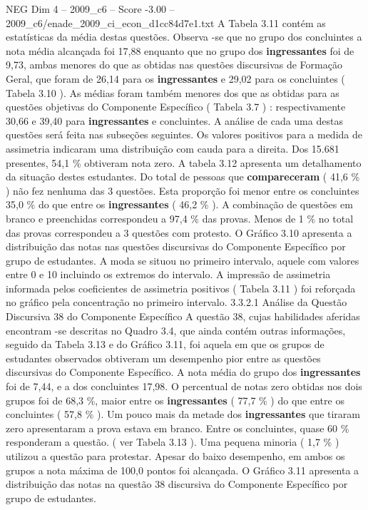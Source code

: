 \begin{textsample}{NEG Dim 4 – 2009\_c6 – Score -3.00 – 2009\_c6/enade\_2009\_ci\_econ\_d1cc84d7e1.txt}
A Tabela 3.11 contém as estatísticas da média destas questões.
Observa -se que no grupo dos concluintes a nota média alcançada foi 17,88 enquanto que no grupo dos \textbf{ingressantes} foi de 9,73, ambas menores do que as obtidas nas questões discursivas de Formação Geral, que foram de 26,14 para os \textbf{ingressantes} e 29,02 para os concluintes ( Tabela 3.10 ).
As médias foram também menores dos que as obtidas para as questões objetivas do Componente Específico ( Tabela 3.7 ) : respectivamente 30,66 e 39,40 para \textbf{ingressantes} e concluintes.
A análise de cada uma destas questões será feita nas subseções seguintes.
Os valores positivos para a medida de assimetria indicaram uma distribuição com cauda para a direita.
Dos 15.681 presentes, 54,1 \% obtiveram nota zero.
A tabela 3.12 apresenta um detalhamento da situação destes estudantes.
Do total de pessoas que \textbf{compareceram} ( 41,6 \% ) não fez nenhuma das 3 questões.
Esta proporção foi menor entre os concluintes 35,0 \% do que entre os \textbf{ingressantes} ( 46,2 \% ).
A combinação de questões em branco e preenchidas correspondeu a 97,4 \% das provas.
Menos de 1 \% no total das provas correspondeu a 3 questões com protesto.
O Gráfico 3.10 apresenta a distribuição das notas nas questões discursivas do Componente Específico por grupo de estudantes.
A moda se situou no primeiro intervalo, aquele com valores entre 0 e 10 incluindo os extremos do intervalo.
A impressão de assimetria informada pelos coeficientes de assimetria positivos ( Tabela 3.11 ) foi reforçada no gráfico pela concentração no primeiro intervalo. 3.3.2.1 Análise da Questão Discursiva 38 do Componente Específico A questão 38, cujas habilidades aferidas encontram -se descritas no Quadro 3.4, que ainda contém outras informações, seguido da Tabela 3.13 e do Gráfico 3.11, foi aquela em que os grupos de estudantes observados obtiveram um desempenho pior entre as questões discursivas do Componente Específico.
A nota média do grupo dos \textbf{ingressantes} foi de 7,44, e a dos concluintes 17,98.
O percentual de notas zero obtidas nos dois grupos foi de 68,3 \%, maior entre os \textbf{ingressantes} ( 77,7 \% ) do que entre os concluintes ( 57,8 \% ).
Um pouco mais da metade dos \textbf{ingressantes} que tiraram zero apresentaram a prova estava em branco.
Entre os concluintes, quase 60 \% responderam a questão. ( ver Tabela 3.13 ).
Uma pequena minoria ( 1,7 \% ) utilizou a questão para protestar.
Apesar do baixo desempenho, em ambos os grupos a nota máxima de 100,0 pontos foi alcançada.
O Gráfico 3.11 apresenta a distribuição das notas na questão 38 discursiva do Componente Específico por grupo de estudantes.

\end{textsample}

